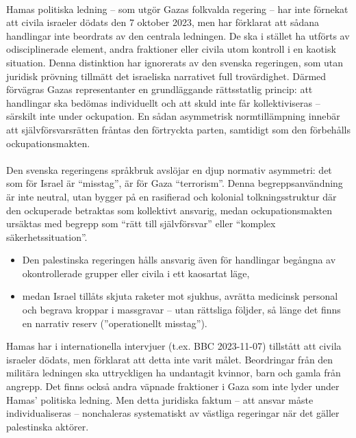 \paragraph{}
Hamas politiska ledning – som utgör Gazas folkvalda regering – har inte förnekat att civila israeler dödats den 7 oktober 2023, men har förklarat att sådana handlingar inte beordrats av den centrala ledningen. De ska i stället ha utförts av odisciplinerade element, andra fraktioner eller civila utom kontroll i en kaotisk situation. Denna distinktion har ignorerats av den svenska regeringen, som utan juridisk prövning tillmätt det israeliska narrativet full trovärdighet. Därmed förvägras Gazas representanter en grundläggande rättsstatlig princip: att handlingar ska bedömas individuellt och att skuld inte får kollektiviseras – särskilt inte under ockupation. En sådan asymmetrisk normtillämpning innebär att självförsvarsrätten fråntas den förtryckta parten, samtidigt som den förbehålls ockupationsmakten.

\paragraph{}
Den svenska regeringens språkbruk avslöjar en djup normativ asymmetri: det som för Israel är \enquote{misstag}, är för Gaza \enquote{terrorism}. Denna begreppsanvändning är inte neutral, utan bygger på en rasifierad och kolonial tolkningsstruktur där den ockuperade betraktas som kollektivt ansvarig, medan ockupationsmakten ursäktas med begrepp som \enquote{rätt till självförsvar} eller \enquote{komplex säkerhetssituation}.

\begin{itemize}
\item Den palestinska regeringen hålls ansvarig även för handlingar begångna av okontrollerade grupper eller civila i ett kaosartat läge,
\item medan Israel tillåts skjuta raketer mot sjukhus, avrätta medicinsk personal och begrava kroppar i massgravar – utan rättsliga följder, så länge det finns en narrativ reserv (”operationellt misstag”).
\end{itemize}

Hamas har i internationella intervjuer (t.ex. BBC 2023-11-07) tillstått att civila israeler dödats, men förklarat att detta inte varit målet. Beordringar från den militära ledningen ska uttryckligen ha undantagit kvinnor, barn och gamla från angrepp. Det finns också andra väpnade fraktioner i Gaza som inte lyder under Hamas’ politiska ledning. Men detta juridiska faktum – att ansvar måste individualiseras – nonchaleras systematiskt av västliga regeringar när det gäller palestinska aktörer.

